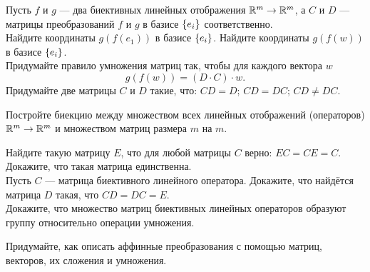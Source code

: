 \documentclass[a4paper,12pt]{article}
\begin{document}


    Пусть $f$ и $g$ --- два биективных линейных отображения $\mathbb{R}^m\rightarrow\mathbb{R}^m$,
    а $C$ и $D$  --- матрицы преобразований $f$ и $g$ в базисе $\left\{e_i\right\}$ соответственно.
    \\
    Найдите координаты $g(f(e_1))$ в базисе $\left\{e_i\right\}$.
    Найдите координаты $g(f(w))$ в базисе $\left\{e_i\right\}$.\\
    Придумайте правило умножения матриц так, чтобы для каждого вектора $w$
\vspace*{-2mm}
    $$g(f(w)) = (D\cdot C) \cdot w.$$
\vspace{-5mm}
    Придумайте две матрицы $C$ и $D$ такие, что:
    $C D = D$;
    $C D = D C$;
    $C D \ne D C$.

    Постройте биекцию между множеством всех линейных отображений (операторов) $\mathbb{R}^m\rightarrow\mathbb{R}^m$ и множеством матриц размера $m$ на $m$.


    Найдите такую матрицу $E$, что для любой матрицы $C$ верно: $EC = CE = C$.\\
    Докажите, что такая матрица единственна.\\
    Пусть $C$ --- матрица биективного линейного оператора. Докажите, что найдётся матрица $D$ такая, что $CD=DC=E$.\\
    Докажите, что множество матриц биективных линейных операторов образуют группу относительно операции умножения.


    Придумайте, как описать аффинные преобразования с помощью матриц, векторов, их сложения и умножения.


\end{document}
